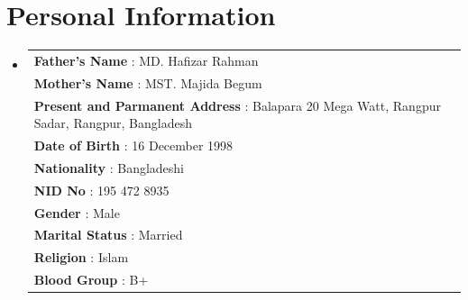 \documentclass[a4paper]{article}
\newcommand{\resumeSubHeadingListStart}{\begin{itemize}[leftmargin=*]}
\newcommand{\resumeSubHeadingListEnd}{\end{itemize}}
\begin{document}
\section{Personal Information}
    \resumeSubHeadingListStart
    \item[]
        \begin{tabular}{l l}
            \textbf{Father's Name} \hspace{33mm} : \hspace{2mm} MD. Hafizar Rahman \\
            \textbf{Mother's Name} \hspace{31.4mm} : \hspace{2mm} MST. Majida Begum \\
            \textbf{Present and Parmanent Address} \hspace{1.4mm} : \hspace{2mm} Balapara 20 Mega Watt, Rangpur Sadar, Rangpur, Bangladesh \\
            \textbf{Date of Birth} \hspace{35.1mm} : \hspace{2mm} 16 December 1998 \\
            \textbf{Nationality} \hspace{39mm} : \hspace{2mm} Bangladeshi \\
            \textbf{NID No} \hspace{44.7mm} : \hspace{2mm} 195 472 8935 \\
            \textbf{Gender} \hspace{45.9mm} : \hspace{2mm} Male \\
            \textbf{Marital Status} \hspace{33.1mm} : \hspace{2mm} Married \\
            \textbf{Religion} \hspace{44.4mm} : \hspace{2mm} Islam \\
            \textbf{Blood Group} \hspace{35.7mm} : \hspace{2mm} B+ 
        \end{tabular}
    \resumeSubHeadingListEnd
    \vspace{1pt}
\end{document}

